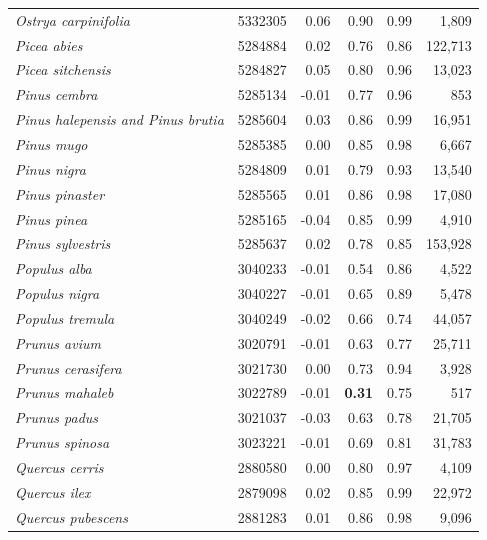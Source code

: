 \documentclass[fleqn,10pt,lineno]{wlpeerj} %
\begin{document}
\begin{center}
\begin{longtable}{lrrrrr}
\emph{Ostrya carpinifolia}               & 5332305 & 0.06  & 0.90 & 0.99 & 1,809   \\
\emph{Picea abies}                       & 5284884 & 0.02  & 0.76 & 0.86 & 122,713 \\
\emph{Picea sitchensis}                  & 5284827 & 0.05  & 0.80 & 0.96 & 13,023  \\
\emph{Pinus cembra}                      & 5285134 & -0.01 & 0.77 & 0.96 & 853     \\
\emph{Pinus halepensis and Pinus brutia} & 5285604 & 0.03  & 0.86 & 0.99 & 16,951  \\
\emph{Pinus mugo}                        & 5285385 & 0.00  & 0.85 & 0.98 & 6,667   \\
\emph{Pinus nigra}                       & 5284809 & 0.01  & 0.79 & 0.93 & 13,540  \\
\emph{Pinus pinaster}                    & 5285565 & 0.01  & 0.86 & 0.98 & 17,080  \\
\emph{Pinus pinea}                       & 5285165 & -0.04 & 0.85 & 0.99 & 4,910   \\
\emph{Pinus sylvestris}                  & 5285637 & 0.02  & 0.78 & 0.85 & 153,928 \\
\emph{Populus alba}                      & 3040233 & -0.01 & 0.54 & 0.86 & 4,522   \\
\emph{Populus nigra}                     & 3040227 & -0.01 & 0.65 & 0.89 & 5,478   \\
\emph{Populus tremula}                   & 3040249 & -0.02 & 0.66 & 0.74 & 44,057  \\
\emph{Prunus avium}                      & 3020791 & -0.01 & 0.63 & 0.77 & 25,711  \\
\emph{Prunus cerasifera}                 & 3021730 & 0.00  & 0.73 & 0.94 & 3,928   \\
\emph{Prunus mahaleb}                    & 3022789 & -0.01 & \textbf{0.31} & 0.75 & 517     \\
\emph{Prunus padus}                      & 3021037 & -0.03 & 0.63 & 0.78 & 21,705  \\
\emph{Prunus spinosa}                    & 3023221 & -0.01 & 0.69 & 0.81 & 31,783  \\
\emph{Quercus cerris}                    & 2880580 & 0.00  & 0.80 & 0.97 & 4,109   \\
\emph{Quercus ilex}                      & 2879098 & 0.02  & 0.85 & 0.99 & 22,972  \\
\emph{Quercus pubescens}                 & 2881283 & 0.01  & 0.86 & 0.98 & 9,096   \\

\end{longtable}
\end{center}
\end{document}
